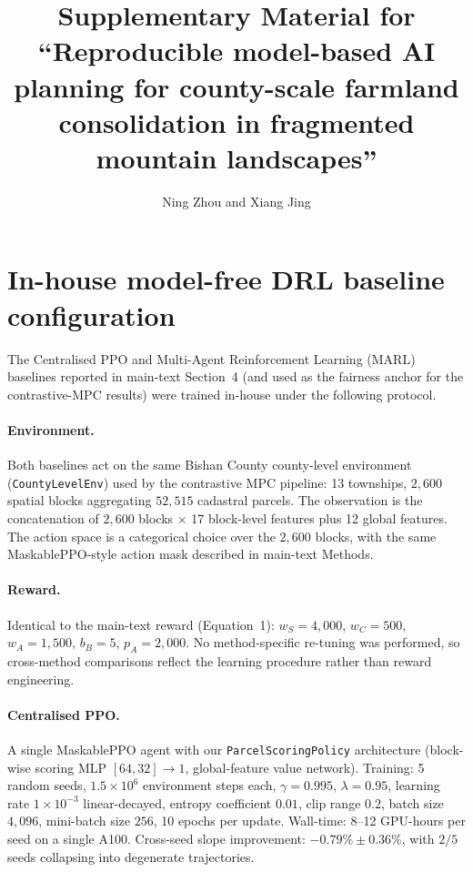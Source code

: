 \documentclass[11pt]{article}
\title{Supplementary Material for ``Reproducible model-based AI planning for county-scale farmland consolidation in fragmented mountain landscapes''}
\author{Ning Zhou and Xiang Jing}
\date{}
\begin{document}
\maketitle
\sloppy  %

\section{In-house model-free DRL baseline configuration}\label{si:s1-drl}

The Centralised PPO and Multi-Agent Reinforcement Learning (MARL) baselines reported in main-text Section~4 (and used as the fairness anchor for the contrastive-MPC results) were trained in-house under the following protocol.

\paragraph{Environment.} Both baselines act on the same Bishan County county-level environment (\texttt{CountyLevelEnv}) used by the contrastive MPC pipeline: 13 townships, $2{,}600$ spatial blocks aggregating $52{,}515$ cadastral parcels. The observation is the concatenation of $2{,}600$ blocks $\times$ 17 block-level features plus 12 global features. The action space is a categorical choice over the $2{,}600$ blocks, with the same MaskablePPO-style action mask described in main-text Methods.

\paragraph{Reward.} Identical to the main-text reward (Equation~1): $w_S = 4{,}000$, $w_C = 500$, $w_A = 1{,}500$, $b_B = 5$, $p_A = 2{,}000$. No method-specific re-tuning was performed, so cross-method comparisons reflect the learning procedure rather than reward engineering.

\paragraph{Centralised PPO.} A single MaskablePPO agent with our \texttt{ParcelScoringPolicy} architecture (block-wise scoring MLP $[64, 32] \to 1$, global-feature value network). Training: 5 random seeds, $1.5 \times 10^6$ environment steps each, $\gamma = 0.995$, $\lambda = 0.95$, learning rate $1\times 10^{-3}$ linear-decayed, entropy coefficient $0.01$, clip range $0.2$, batch size $4{,}096$, mini-batch size $256$, 10 epochs per update. Wall-time: 8--12 GPU-hours per seed on a single A100. Cross-seed slope improvement: $-0.79\% \pm 0.36\%$, with $2/5$ seeds collapsing into degenerate trajectories.
\end{document}
